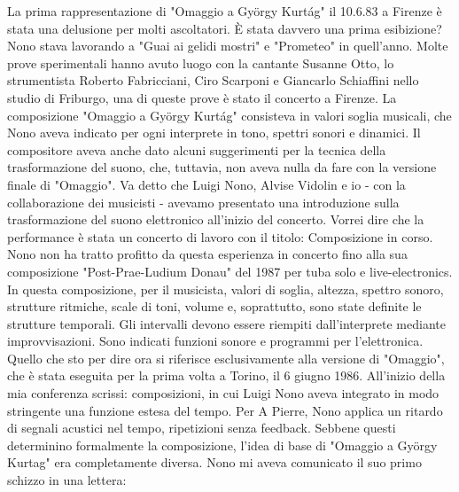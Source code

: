La prima rappresentazione di "Omaggio a György Kurtág" il 10.6.83 a Firenze è stata una delusione per molti ascoltatori. È stata davvero una prima esibizione? 
Nono stava lavorando a "Guai ai gelidi mostri" e "Prometeo" in quell'anno. Molte prove sperimentali hanno avuto luogo con la cantante Susanne Otto, lo strumentista Roberto Fabricciani, Ciro Scarponi e Giancarlo Schiaffini nello studio di Friburgo, una di queste prove è stato il concerto a Firenze. La composizione "Omaggio a György Kurtág" consisteva in valori soglia musicali, che Nono aveva indicato per ogni interprete in tono, spettri sonori e dinamici. Il compositore aveva anche dato alcuni suggerimenti per la tecnica della trasformazione del suono, che, tuttavia, non aveva nulla da fare con la versione finale di "Omaggio". Va detto che Luigi Nono, Alvise Vidolin e io - con la collaborazione dei musicisti - avevamo presentato una introduzione sulla trasformazione del suono elettronico all'inizio del concerto. Vorrei dire che la performance è stata un concerto di lavoro con il titolo: Composizione in corso. Nono non ha tratto profitto da questa esperienza in concerto fino alla sua composizione "Post-Prae-Ludium Donau" del 1987 per tuba solo e live-electronics. In questa composizione, per il musicista, valori di soglia, altezza, spettro sonoro, strutture ritmiche, scale di toni, volume e, soprattutto, sono state definite le strutture temporali. Gli intervalli devono essere riempiti dall'interprete mediante improvvisazioni. Sono indicati funzioni sonore e programmi per l'elettronica. 
Quello che sto per dire ora si riferisce esclusivamente alla versione di "Omaggio", che è stata eseguita per la prima volta a Torino, il 6 giugno 1986. 
All'inizio della mia conferenza scrissi: composizioni, in cui Luigi Nono aveva integrato in modo stringente una funzione estesa del tempo. Per A Pierre, Nono applica un ritardo di segnali acustici nel tempo, ripetizioni senza feedback. Sebbene questi determinino formalmente la composizione, l'idea di base di "Omaggio a György Kurtag" era completamente diversa. 
Nono mi aveva comunicato il suo primo schizzo in una lettera: 

